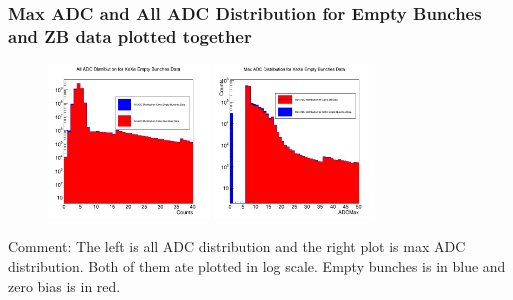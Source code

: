\documentclass{beamer}
\begin{document}
\begin{frame}
\frametitle{Max ADC and All ADC Distribution for Empty Bunches and ZB data plotted together}

\begin{figure}
\includegraphics[width=0.38\textwidth]{Plots/AllBothADCDisLog.png}
\includegraphics[width=0.38\textwidth]{Plots/ADCMaxBothLog.png}
\end{figure}

\begin{block}
{Comment: The left is all ADC distribution and the right plot is max ADC distribution. Both of them ate plotted in log scale. Empty bunches is in blue and zero bias is in red.}
\end{block}
\end{frame}


\end{document}
